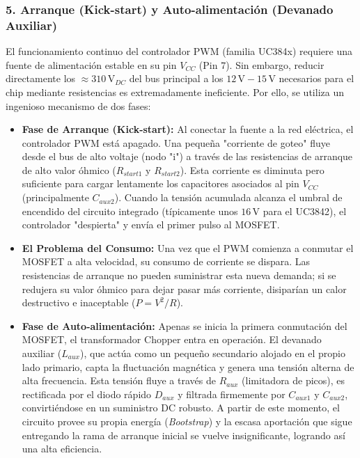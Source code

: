 \documentclass[12pt, a4paper]{article}
\begin{document}
\subsubsection*{5. Arranque (Kick-start) y Auto-alimentación (Devanado Auxiliar)}
El funcionamiento continuo del controlador PWM (familia UC384x) requiere una fuente de alimentación estable en su pin $V_{CC}$ (Pin 7). Sin embargo, reducir directamente los $\approx 310\,\text{V}_{DC}$ del bus principal a los $12\,\text{V}-15\,\text{V}$ necesarios para el chip mediante resistencias es extremadamente ineficiente. Por ello, se utiliza un ingenioso mecanismo de dos fases:
\begin{itemize}
    \item \textbf{Fase de Arranque (Kick-start):} Al conectar la fuente a la red eléctrica, el controlador PWM está apagado. Una pequeña "corriente de goteo" fluye desde el bus de alto voltaje (nodo "i") a través de las resistencias de arranque de alto valor óhmico ($R_{start1}$ y $R_{start2}$). Esta corriente es diminuta pero suficiente para cargar lentamente los capacitores asociados al pin $V_{CC}$ (principalmente $C_{aux2}$). Cuando la tensión acumulada alcanza el umbral de encendido del circuito integrado (típicamente unos $16\,\text{V}$ para el UC3842), el controlador "despierta" y envía el primer pulso al MOSFET.
    \item \textbf{El Problema del Consumo:} Una vez que el PWM comienza a conmutar el MOSFET a alta velocidad, su consumo de corriente se dispara. Las resistencias de arranque no pueden suministrar esta nueva demanda; si se redujera su valor óhmico para dejar pasar más corriente, disiparían un calor destructivo e inaceptable ($P = V^2/R$).
    \item \textbf{Fase de Auto-alimentación:} Apenas se inicia la primera conmutación del MOSFET, el transformador Chopper entra en operación. El devanado auxiliar ($L_{aux}$), que actúa como un pequeño secundario alojado en el propio lado primario, capta la fluctuación magnética y genera una tensión alterna de alta frecuencia. Esta tensión fluye a través de $R_{aux}$ (limitadora de picos), es rectificada por el diodo rápido $D_{aux}$ y filtrada firmemente por $C_{aux1}$ y $C_{aux2}$, convirtiéndose en un suministro DC robusto. A partir de este momento, el circuito provee su propia energía (\textit{Bootstrap}) y la escasa aportación que sigue entregando la rama de arranque inicial se vuelve insignificante, logrando así una alta eficiencia.
\end{itemize}
\end{document}
